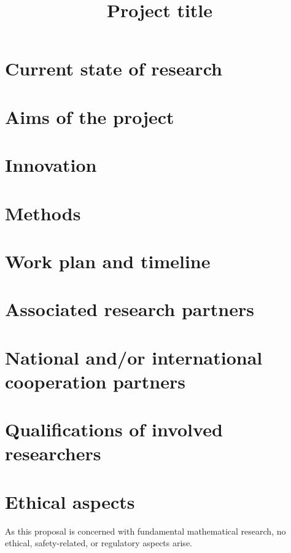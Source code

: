 \documentclass[a4paper,11pt]{scrartcl}
\title{Project title}
\begin{document}
\maketitle
\tableofcontents

\newpage

\section{Current state of research}\label{sec:state}
\cite{example}

\section{Aims of the project}\label{sec:aims}

\section{Innovation}\label{sec:innovation}

\section{Methods}\label{sec:methods}

\section{Work plan and timeline}\label{sec:workplan}

\section{Associated research partners}\label{sec:partners}

\section{National and/or international cooperation partners}\label{sec:cooperations}


\section{Qualifications of involved researchers}\label{sec:qualifications}

\section{Ethical aspects}\label{sec:ethics}

As this proposal is concerned with fundamental mathematical research, no ethical, safety-related, or regulatory aspects arise.
\end{document}
